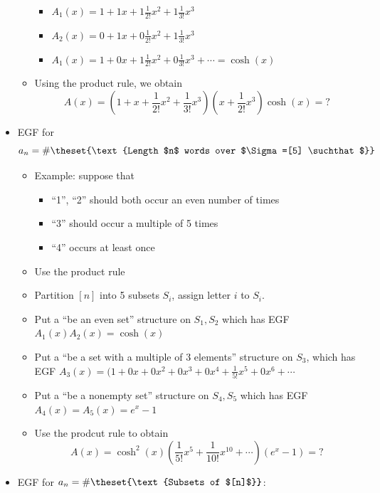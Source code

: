 \begin{itemize}
\begin{itemize}
    \begin{itemize}
    \tightlist
    \item
      \(A_1(x) = 1 + 1x + 1\frac{1}{2!}x^2 + 1\frac{1}{3!}x^3\)
    \item
      \(A_2(x) = 0 + 1x + 0\frac{1}{2!}x^2 + 1\frac{1}{3!}x^3\)
    \item
      \(A_1(x) = 1 + 0x + 1\frac{1}{2!}x^2 + 0\frac{1}{3!}x^3 + \cdots = \cosh(x)\)
    \end{itemize}
  \item
    Using the product rule, we obtain \[
    A(x) = (1 +x + \frac{1}{2!}x^2 + \frac{1}{3!}x^3)(x + \frac{1}{2!}x^3)\cosh(x) = ?
    \]
  \end{itemize}
\item
  EGF for
  \[a_n = \#\theset{\text{Length $n$ words over $\Sigma =[5] \suchthat$}}\]

  \begin{itemize}
  \tightlist
  \item
    Example: suppose that

    \begin{itemize}
    \tightlist
    \item
      ``1'', ``2'' should both occur an even number of times
    \item
      ``3'' should occur a multiple of 5 times
    \item
      ``4'' occurs at least once
    \end{itemize}
  \item
    Use the product rule
  \item
    Partition \([n]\) into 5 subsets \(S_i\), assign letter \(i\) to
    \(S_i\).
  \item
    Put a ``be an even set'' structure on \(S_ 1, S_2\) which has EGF
    \(A_1(x) A_2(x) = \cosh(x)\)
  \item
    Put a ``be a set with a multiple of 3 elements'' structure on
    \(S_3\), which has EGF
    \(A_3(x) = (1 + 0x + 0x^2 + 0x^3 + 0x^4 + \frac{1}{5!}x^5 + 0x^6 + \cdots\)
  \item
    Put a ``be a nonempty set'' structure on \(S_4, S_5\) which has EGF
    \(A_4(x) = A_5(x) = e^x - 1\)
  \item
    Use the prodcut rule to obtain \[
    A(x) = \cosh^2(x)\left(\frac{1}{5!}x^5 + \frac{1}{10!}x^{10} + \cdots \right)(e^x-1) = ?
    \]
  \end{itemize}
\item
  EGF for \(a_n = \#\theset{\text{Subsets of $[n]$}}\):


\end{itemize}
